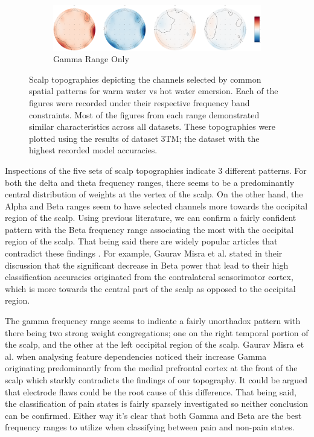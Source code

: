 \documentclass[11pt]{article}
\begin{document}
\begin{figure}
\begin{subfigure}[b]{1\textwidth}
         \centering
         \includegraphics[width=\textwidth]{Gamma_Top.png}
         \caption{Gamma Range Only}
         \label{fig:Gamma}
     \end{subfigure}
        \caption{Scalp topographies depicting the channels selected by common spatial patterns for warm water vs hot water emersion. Each of the figures were recorded under their respective frequency band constraints. Most of the figures from each range demonstrated similar characteristics across all datasets. These topographies were plotted using the results of dataset 3TM; the dataset with the highest recorded model accuracies.}
        \label{fig:All}
\end{figure}

Inspections of the five sets of scalp topographies indicate 3 different patterns. For both the delta and theta frequency ranges, there seems to be a predominantly central distribution of weights at the vertex of the scalp. On the other hand, the Alpha and Beta ranges seem to have selected channels more towards the occipital region of the scalp. Using previous literature, we can confirm a fairly confident pattern with the Beta frequency range associating the most with the occipital region of the scalp. That being said there are widely popular articles that contradict these findings \cite{Misra2017-ol}. For example, Gaurav Misra et al. stated in their discussion that the significant decrease in Beta power that lead to their high classification accuracies originated from the contralateral sensorimotor cortex, which is more towards the central part of the scalp as opposed to the occipital region. 

The gamma frequency range seems to indicate a fairly unorthadox pattern with there being two strong weight congregations; one on the right temporal portion of the scalp, and the other at the left occipital region of the scalp. Gaurav Misra et al. when analysing feature dependencies noticed their increase Gamma originating predominantly from the medial prefrontal cortex at the front of the scalp which starkly contradicts the findings of our topography. It could be argued that electrode flaws could be the root cause of this difference. That being said, the classification of pain states is fairly sparsely investigated so neither conclusion can be confirmed. Either way it's clear that both Gamma and Beta are the best frequency ranges to utilize when classifying between pain and non-pain states. 
\end{document}
